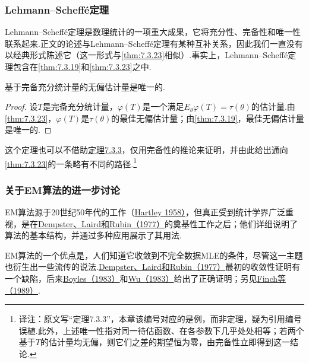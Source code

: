 \subsubsection{Lehmann--Scheffé定理}\label{sec:7.5.3}
Lehmann--Scheffé定理是数理统计的一项重大成果，它将充分性、完备性和唯一性联系起来.正文的论述与Lehmann--Scheffé定理有某种互补关系，因此我们一直没有以经典形式陈述它（这一形式与\autoref{thm:7.3.23}相似）.事实上，Lehmann--Scheffé定理包含在\autoref{thm:7.3.19}和\autoref{thm:7.3.23}之中.
\begin{theorem}\label{thm:7.5.1}
基于完备充分统计量的无偏估计量是唯一的.
\end{theorem}
\begin{proof}
设$T$是完备充分统计量，$\varphi(T)$是一个满足$E_\theta\varphi(T)=\tau(\theta)$的估计量.由\autoref{thm:7.3.23}，$\varphi(T)$是$\tau(\theta)$的最佳无偏估计量；由\autoref{thm:7.3.19}，最佳无偏估计量是唯一的.
\end{proof}
这个定理也可以不借助\hyperref[ex:7.3.3]{定理7.3.3}，仅用完备性的推论来证明，并由此给出通向\autoref{thm:7.3.23}的一条略有不同的路径.\footnote{译注：原文写“定理7.3.3”，本章该编号对应的是例，而非定理，疑为引用编号误植.此外，上述唯一性指对同一待估函数、在各参数下几乎处处相等；若两个基于$T$的估计量均无偏，则它们之差的期望恒为零，由完备性立即得到这一结论.}

\subsubsection{关于EM算法的进一步讨论}\label{sec:7.5.4}
EM算法源于20世纪50年代的工作（\hyperref[bib:source159]{Hartley 1958）}，但真正受到统计学界广泛重视，是在\hyperref[bib:source97]{Dempster、Laird和Rubin（1977）}的奠基性工作之后；他们详细说明了算法的基本结构，并通过多种应用展示了其用法.

EM算法的一个优点是，人们知道它收敛到不完全数据MLE的条件，尽管这一主题也衍生出一些流传的说法.\hyperref[bib:source97]{Dempster、Laird和Rubin（1977）}最初的收敛性证明有一个缺陷，后来\hyperref[bib:source47]{Boyles（1983）}和\hyperref[bib:source335]{Wu（1983）}给出了正确证明；另见\hyperref[bib:source122]{Finch等（1989）}.


